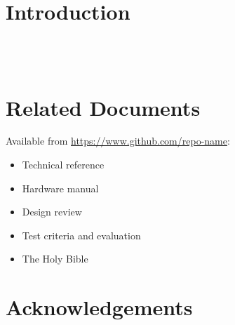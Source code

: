 \documentclass[a4paper, oneside, british]{memoir}
\newcommand{\setdocname}[1]{\def\docname{#1}}
\newcommand{\docname}{}
\newcommand{\setsysname}[1]{\def\sysname{#1}}
\newcommand{\sysname}{}
\newcommand{\setorglabel}[1]{\def\orglabel{#1}}
\newcommand{\orglabel}{}
\newlength{\margindedent}
\numberwithin{figure}{section}
\begin{document}
  \setorglabel{Example Organisation} 
  \setsysname{Example System}
  \setdocname{Document Title}


  \vspace*{-1in}
  \noindent{}

  \section*{\hspace{-\margindedent}Introduction}
  \noindent\lipsum[1][1-5]\\[0.5em]
  \noindent\lipsum[1][5-8]\\[0.5em]
  \noindent\lipsum[1][8-13]
  
  \section*{\hspace{-\margindedent}Related Documents}
  Available from \url{https://www.github.com/repo-name}:
  \vspace{-0.5em}
  \begin{itemize}
    \item Technical reference
    \item Hardware manual
    \item Design review
    \item Test criteria and evaluation
    \item The Holy Bible
  \end{itemize}
  
  \section*{\hspace{-\margindedent}Acknowledgements}
  \noindent\lipsum[1][1-8]\\[0.5em]
  \noindent\lipsum[1][8-14]
\end{document}
